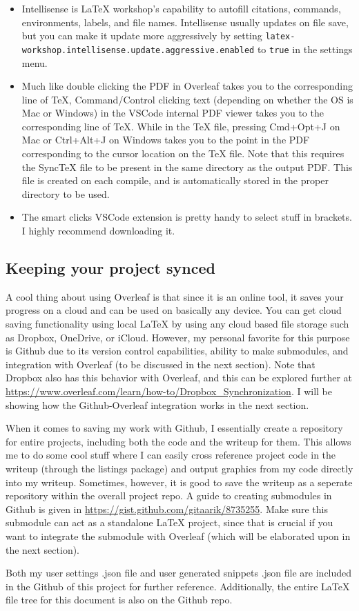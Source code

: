 \begin{itemize}
    \item 
    Intellisense is LaTeX workshop's capability to autofill citations, commands, environments, labels, and file names. Intellisense usually updates on file save, but you can make it update more aggressively by setting \verb|latex-workshop.intellisense.update.aggressive.enabled| to \verb|true| in the settings menu.

    \item 
    Much like double clicking the PDF in Overleaf takes you to the corresponding line of TeX, Command/Control clicking text (depending on whether the OS is Mac or Windows) in the VSCode internal PDF viewer takes you to the corresponding line of TeX. While in the TeX file, pressing Cmd+Opt+J on Mac or Ctrl+Alt+J on Windows takes you to the point in the PDF corresponding to the cursor location on the TeX file. Note that this requires the SyncTeX file to be present in the same directory as the output PDF. This file is created on each compile, and is automatically stored in the proper directory to be used.

    \item The smart clicks VSCode extension is pretty handy to select stuff in brackets. I highly recommend downloading it.
    
\end{itemize}

\subsection{Keeping your project synced}
A cool thing about using Overleaf is that since it is an online tool, it saves your progress on a cloud and can be used on basically any device. You can get cloud saving functionality using local \LaTeX{} by using any cloud based file storage such as Dropbox, OneDrive, or iCloud. However, my personal favorite for this purpose is Github due to its version control capabilities, ability to make submodules, and integration with Overleaf (to be discussed in the next section). Note that Dropbox also has this behavior with Overleaf, and this can be explored further at \url{https://www.overleaf.com/learn/how-to/Dropbox_Synchronization}. I will be showing how the Github-Overleaf integration works in the next section. 

When it comes to saving my work with Github, I essentially create a repository for entire projects, including both the code and the writeup for them. This allows me to do some cool stuff where I can easily cross reference project code in the writeup (through the listings package) and output graphics from my code directly into my writeup. Sometimes, however, it is good to save the writeup as a seperate repository within the overall project repo. A guide to creating submodules in Github is given in \url{https://gist.github.com/gitaarik/8735255}. Make sure this submodule can act as a standalone \LaTeX{} project, since that is crucial if you want to integrate the submodule with Overleaf (which will be elaborated upon in the next section).


Both my user settings .json file and user generated snippets .json file are included in the Github of this project for further reference. Additionally, the entire \LaTeX{} file tree for this document is also on the Github repo.

